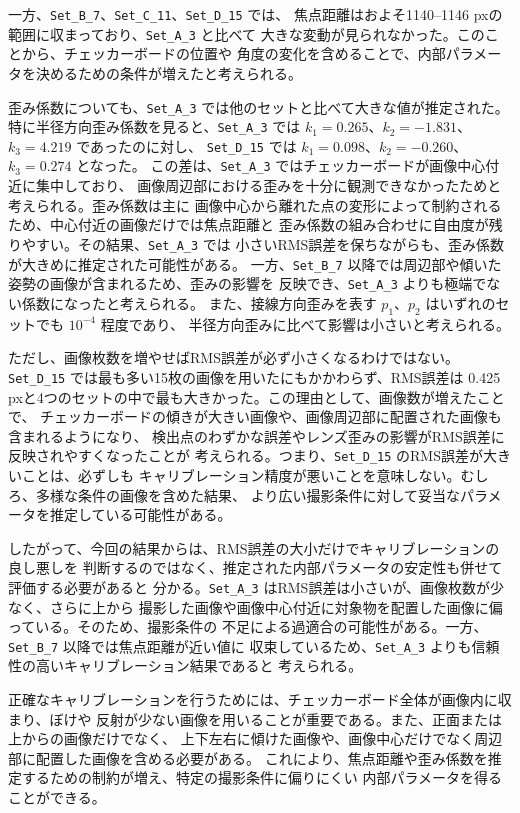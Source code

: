 \documentclass[11pt,a4paper]{ltjsarticle}
\begin{document}
一方、\texttt{Set\_B\_7}、\texttt{Set\_C\_11}、\texttt{Set\_D\_15} では、
焦点距離はおよそ1140--1146 pxの範囲に収まっており、\texttt{Set\_A\_3} と比べて
大きな変動が見られなかった。このことから、チェッカーボードの位置や
角度の変化を含めることで、内部パラメータを決めるための条件が増えたと考えられる。

歪み係数についても、\texttt{Set\_A\_3} では他のセットと比べて大きな値が推定された。
特に半径方向歪み係数を見ると、\texttt{Set\_A\_3} では
$k_1=0.265$、$k_2=-1.831$、$k_3=4.219$ であったのに対し、
\texttt{Set\_D\_15} では $k_1=0.098$、$k_2=-0.260$、$k_3=0.274$ となった。
この差は、\texttt{Set\_A\_3} ではチェッカーボードが画像中心付近に集中しており、
画像周辺部における歪みを十分に観測できなかったためと考えられる。歪み係数は主に
画像中心から離れた点の変形によって制約されるため、中心付近の画像だけでは焦点距離と
歪み係数の組み合わせに自由度が残りやすい。その結果、\texttt{Set\_A\_3} では
小さいRMS誤差を保ちながらも、歪み係数が大きめに推定された可能性がある。
一方、\texttt{Set\_B\_7} 以降では周辺部や傾いた姿勢の画像が含まれるため、歪みの影響を
反映でき、\texttt{Set\_A\_3} よりも極端でない係数になったと考えられる。
また、接線方向歪みを表す $p_1$、$p_2$ はいずれのセットでも $10^{-4}$ 程度であり、
半径方向歪みに比べて影響は小さいと考えられる。

ただし、画像枚数を増やせばRMS誤差が必ず小さくなるわけではない。
\texttt{Set\_D\_15} では最も多い15枚の画像を用いたにもかかわらず、RMS誤差は
0.425 pxと4つのセットの中で最も大きかった。この理由として、画像数が増えたことで、
チェッカーボードの傾きが大きい画像や、画像周辺部に配置された画像も含まれるようになり、
検出点のわずかな誤差やレンズ歪みの影響がRMS誤差に反映されやすくなったことが
考えられる。つまり、\texttt{Set\_D\_15} のRMS誤差が大きいことは、必ずしも
キャリブレーション精度が悪いことを意味しない。むしろ、多様な条件の画像を含めた結果、
より広い撮影条件に対して妥当なパラメータを推定している可能性がある。

したがって、今回の結果からは、RMS誤差の大小だけでキャリブレーションの良し悪しを
判断するのではなく、推定された内部パラメータの安定性も併せて評価する必要があると
分かる。\texttt{Set\_A\_3} はRMS誤差は小さいが、画像枚数が少なく、さらに上から
撮影した画像や画像中心付近に対象物を配置した画像に偏っている。そのため、撮影条件の
不足による過適合の可能性がある。一方、\texttt{Set\_B\_7} 以降では焦点距離が近い値に
収束しているため、\texttt{Set\_A\_3} よりも信頼性の高いキャリブレーション結果であると
考えられる。

正確なキャリブレーションを行うためには、チェッカーボード全体が画像内に収まり、ぼけや
反射が少ない画像を用いることが重要である。また、正面または上からの画像だけでなく、
上下左右に傾けた画像や、画像中心だけでなく周辺部に配置した画像を含める必要がある。
これにより、焦点距離や歪み係数を推定するための制約が増え、特定の撮影条件に偏りにくい
内部パラメータを得ることができる。
\end{document}
